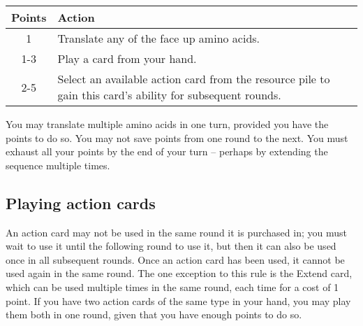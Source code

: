 \documentclass[a4paper,11pt,oneside]{memoir}
\begin{document}
\begin{table}[h!]
\begin{tabular}{cl}
\hline
\textbf{Points} & \textbf{Action}\\
\hline
    1    & Translate any of the face up amino acids.\\
    1-3  & Play a card from your hand.\\
    2-5  & Select an available action card from the resource pile to gain this card's ability for subsequent rounds.\\
\hline
\end{tabular}
\label{turntable}
\end{table}

You may translate multiple amino acids in one turn, provided you have the points to do so.
You may not save points from one round to the next.
You must exhaust all your points by the end of your turn -- perhaps by extending the sequence multiple times.

\subsection*{Playing action cards}
An action card may not be used in the same round it is purchased in; you must wait to use it until the following round to use it, but then it can also be used once in all subsequent rounds.
Once an action card has been used, it cannot be used again in the same round.
The one exception to this rule is the Extend card, which can be used multiple times in the same round, each time for a cost of 1 point.
If you have two action cards of the same type in your hand, you may play them both in one round, given that you have enough points to do so. 
\end{document}
